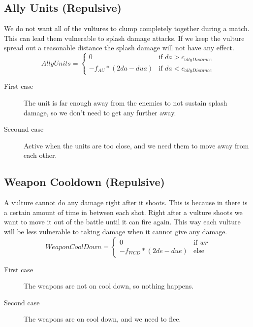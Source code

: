 	\subsection{Ally Units (Repulsive)}
We do not want all of the vultures to clump completely together during a match. This can lead them vulnerable to splash damage attacks. If we keep the vulture spread out a reasonable distance the splash damage will not have any effect.
		\begin{displaymath}
			AllyUnits = \begin{cases}
					0 & \text{if } da > c_{allyDistance}\\
					-f_{AU} * (2da - dua) & \text{if } da < c_{allyDistance}
				\end{cases}		
		\end{displaymath}
	\begin{description}	
		\item[First case] The unit is far enough away from the enemies to not sustain splash damage, so we don't need to get any further away.
		\item[Secound case] Active when the units are too close, and we need them to move away from each other.
	\end{description}
	\subsection{Weapon Cooldown (Repulsive)}
A vulture cannot do any damage right after it shoots. This is because in there is a certain amount of time in between each shot. Right after a vulture shoots we want to move it out of the battle until it can fire again. This way each vulture will be less vulnerable to taking damage when it cannot give any damage.
		\begin{displaymath}
			WeaponCoolDown = \begin{cases}
					0 & \text{if } wr\\
					-f_{WCD} * (2de - due) & \text{else}
				\end{cases}		
		\end{displaymath}

	\begin{description}	
		\item[First case] The weapons are not on cool down, so nothing happens. 
		\item[Second case] The weapons are on cool down, and we need to flee.        
    \end{description}	
